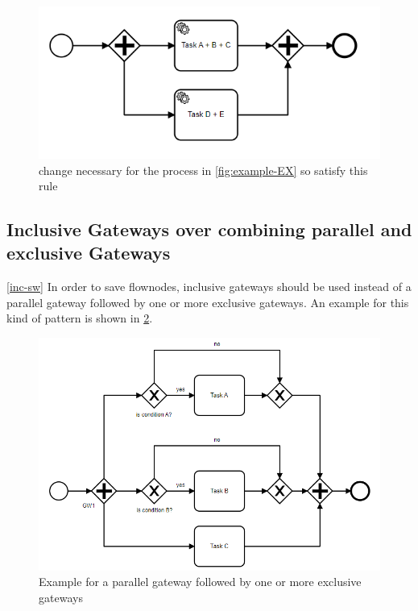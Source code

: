 \begin{figure}[H]
	\centering
	\includegraphics[width=0.7\columnwidth]{graphics/merge-suggestion-2}
	\caption{change necessary for the process in \ref{fig:example-EX} so satisfy this rule} 
	\label{fig:example-EX-fix} 
\end{figure}

\subsection{Inclusive Gateways over combining parallel and exclusive Gateways}\ref{inc-sw}
In order to save flownodes, inclusive gateways should be used instead of a parallel gateway followed by one or more exclusive gateways. An example for this kind of pattern is shown in \ref{fig:example-GW}.

\begin{figure}[H]
	\centering
	\includegraphics[width=0.9\columnwidth]{graphics/exclusive-suggestion-1}
	\caption{Example for a parallel gateway followed by one or more exclusive gateways} 
	\label{fig:example-GW} 
\end{figure}

